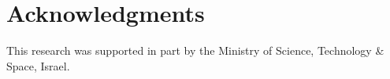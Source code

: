 \documentclass[letterpaper]{article} %
\begin{document}










\section{Acknowledgments}
This research was supported in part by the Ministry of Science, Technology \& Space, Israel.
\end{document}
